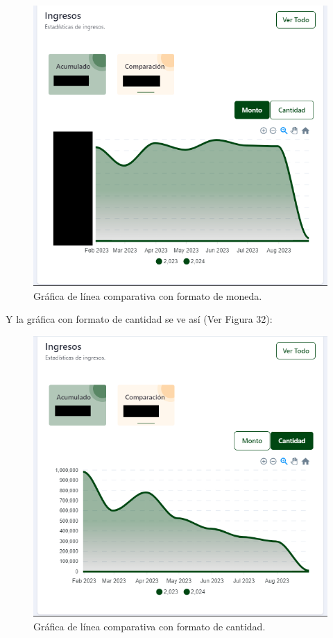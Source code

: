     \begin{figure}[H]
        \begin{center}
            \includegraphics[scale=0.40]{img/actividades/dahsboard-admin/ingreso-comp-monto.png}
            \caption{Gráfica de línea comparativa con formato de moneda.}
            \label{fig:ingreso-comp-monto}
        \end{center}
    \end{figure}

Y la gráfica con formato de cantidad se ve así (Ver Figura 32): 

    \begin{figure}[H]
        \begin{center}
            \includegraphics[scale=0.40]{img/actividades/dahsboard-admin/ingreso-comp-cantidad.png}
            \caption{Gráfica de línea comparativa con formato de cantidad.}
            \label{fig:ingreso-comp-cantidad}
        \end{center}
    \end{figure}
